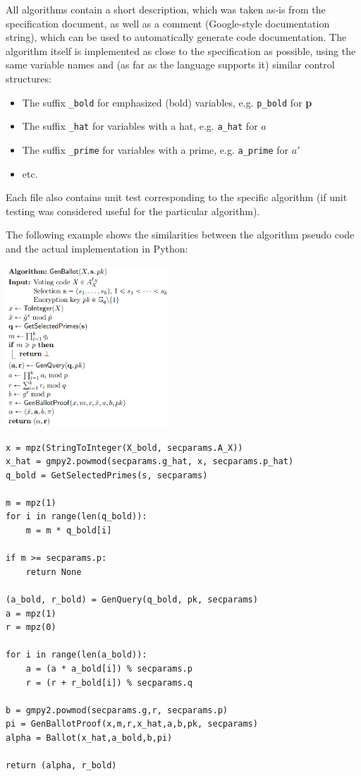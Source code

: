 All algorithms contain a short description, which was taken as-is from the specification document, as well as a comment (Google-style documentation string), which can be used to automatically generate code documentation. The algorithm itself is implemented as close to the specification as possible, using the same variable names and (as far as the language supports it) similar control structures:

\begin{itemize}
	\item The suffix \texttt{\_bold} for emphasized (bold) variables, e.g. \texttt{p\_bold} for \textbf{p}
	\item The suffix \texttt{\_hat} for variables with a hat, e.g. \texttt{a\_hat} for $\hat{a}$
	\item The suffix \texttt{\_prime} for variables with a prime, e.g. \texttt{a\_prime} for $a'$
	\item etc.
\end{itemize}

Each file also contains unit test corresponding to the specific algorithm (if unit testing was considered useful for the particular algorithm).

The following example shows the similarities between the algorithm pseudo code and the actual implementation in Python:

\begin{multicols}{2}
\includegraphics[width=0.46\textwidth]{assets/genballot.png}
\columnbreak
\begin{verbatim}
x = mpz(StringToInteger(X_bold, secparams.A_X))
x_hat = gmpy2.powmod(secparams.g_hat, x, secparams.p_hat)
q_bold = GetSelectedPrimes(s, secparams)

m = mpz(1)
for i in range(len(q_bold)):
    m = m * q_bold[i]

if m >= secparams.p:
    return None

(a_bold, r_bold) = GenQuery(q_bold, pk, secparams)
a = mpz(1)
r = mpz(0)

for i in range(len(a_bold)):
    a = (a * a_bold[i]) % secparams.p
    r = (r + r_bold[i]) % secparams.q

b = gmpy2.powmod(secparams.g,r, secparams.p)
pi = GenBallotProof(x,m,r,x_hat,a,b,pk, secparams)
alpha = Ballot(x_hat,a_bold,b,pi)

return (alpha, r_bold)
\end{verbatim}
\end{multicols}

